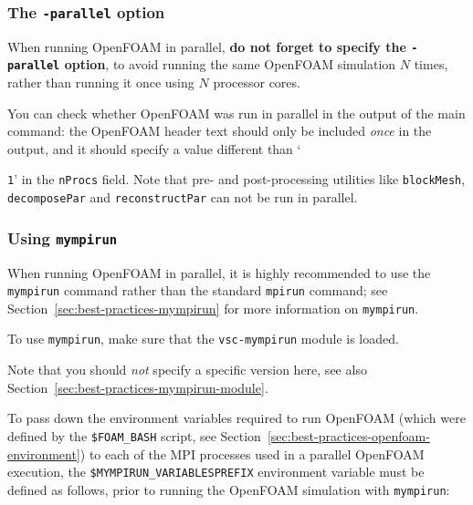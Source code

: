 \subsubsection{The {\small\texttt{-parallel}} option}

When running OpenFOAM in parallel, \textbf{do not forget to specify the \texttt{\small{-parallel}} option},
to avoid running the same OpenFOAM simulation $N$ times, rather than running it once using $N$ processor cores.

You can check whether OpenFOAM was run in parallel in the output of the main command:
the OpenFOAM header text should only be included \textit{once} in the output, and it should specify a value different
than `{\small{\texttt{1}}' in the {\small\texttt{nProcs}} field. Note that pre- and post-processing utilities like
{\small\texttt{blockMesh}}, {\small\texttt{decomposePar}} and {\small\texttt{reconstructPar}} can not be run in parallel.

\subsubsection{Using \texttt{mympirun}}

When running OpenFOAM in parallel, it is highly recommended to use the {\small\texttt{mympirun}} command rather than
the standard {\small\texttt{mpirun}} command;
see Section~\ref{sec:best-practices-mympirun} for more information on {\small\texttt{mympirun}}.

To use {\small\texttt{mympirun}}, make sure that the \texttt{\small{vsc-mympirun}} module is loaded.

\begin{prompt}
\end{prompt}

Note that you should \textit{not} specify a specific version here,
see also Section~\ref{sec:best-practices-mympirun-module}.

To pass down the environment variables required to run OpenFOAM (which were defined by the
\texttt{\small{\$FOAM\_BASH}} script, see Section~\ref{sec:best-practices-openfoam-environment})
to each of the MPI processes used in a parallel OpenFOAM execution,
the \texttt{\small{\$MYMPIRUN\_VARIABLESPREFIX}} environment variable must be defined as follows,
prior to running the OpenFOAM simulation with \texttt{\small{mympirun}}:

\begin{prompt}
\end{prompt}

}

